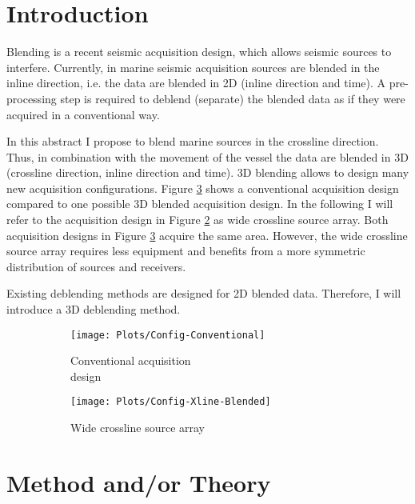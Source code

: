 \documentclass{madrid15WS}
\begin{document}
\section{Introduction}

Blending is a recent seismic acquisition design, which allows seismic sources to interfere. Currently, in marine seismic acquisition sources are blended in the inline direction, i.e. the data are blended in 2D (inline direction and time). A pre-processing step is required to deblend (separate) the blended data as if they were acquired in a conventional way. 

In this abstract I propose to blend marine sources in the crossline direction. Thus, in combination with the movement of the vessel the data are blended in 3D (crossline direction, inline direction and time). 3D blending allows to design many new acquisition configurations. Figure \ref{fig:Intro-Configs} shows a conventional acquisition design compared to one possible 3D blended acquisition design. In the following I will refer to the acquisition design in Figure \ref{fig:Intro-Config-Xline-Blended} as wide crossline source array. Both acquisition designs in Figure \ref{fig:Intro-Configs} acquire the same area. However, the wide crossline source array requires less equipment and benefits from a more symmetric distribution of sources and receivers.

Existing deblending methods are designed for 2D blended data. Therefore, I will introduce a 3D deblending method. 

\begin{figure}[h!]
	\centering
	\begin{subfigure}[t]{0.3\textwidth}
		\centering
		\texttt{[image: Plots/Config-Conventional]}
		\caption{Conventional acquisition \\design}
		\label{fig:Intro-Config-Conventional}
	\end{subfigure}
	\qquad \qquad 
	\centering
	\begin{subfigure}[t]{0.3\textwidth}
		\centering
		\texttt{[image: Plots/Config-Xline-Blended]}
		\caption{Wide crossline source array}
		\label{fig:Intro-Config-Xline-Blended}
	\end{subfigure}
	
	\caption{}
	\label{fig:Intro-Configs}
	
\end{figure}


\section{Method and/or Theory}
\end{document}
